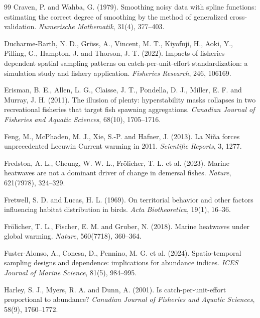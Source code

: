 \begin{thebibliography}{99}
Craven, P. and Wahba, G. (1979). Smoothing noisy data with spline functions: estimating the correct degree of smoothing by the method of generalized cross-validation. \textit{Numerische Mathematik}, 31(4), 377--403.

Ducharme-Barth, N. D., Gr\"uss, A., Vincent, M. T., Kiyofuji, H., Aoki, Y., Pilling, G., Hampton, J. and Thorson, J. T. (2022). Impacts of fisheries-dependent spatial sampling patterns on catch-per-unit-effort standardization: a simulation study and fishery application. \textit{Fisheries Research}, 246, 106169.

Erisman, B. E., Allen, L. G., Claisse, J. T., Pondella, D. J., Miller, E. F. and Murray, J. H. (2011). The illusion of plenty: hyperstability masks collapses in two recreational fisheries that target fish spawning aggregations. \textit{Canadian Journal of Fisheries and Aquatic Sciences}, 68(10), 1705--1716.

Feng, M., McPhaden, M. J., Xie, S.-P. and Hafner, J. (2013). La Ni\~{n}a forces unprecedented Leeuwin Current warming in 2011. \textit{Scientific Reports}, 3, 1277.

Fredston, A. L., Cheung, W. W. L., Fr\"olicher, T. L. et al. (2023). Marine heatwaves are not a dominant driver of change in demersal fishes. \textit{Nature}, 621(7978), 324--329.

Fretwell, S. D. and Lucas, H. L. (1969). On territorial behavior and other factors influencing habitat distribution in birds. \textit{Acta Biotheoretica}, 19(1), 16--36.

Fr\"olicher, T. L., Fischer, E. M. and Gruber, N. (2018). Marine heatwaves under global warming. \textit{Nature}, 560(7718), 360--364.

Fuster-Alonso, A., Conesa, D., Pennino, M. G. et al. (2024). Spatio-temporal sampling designs and dependence: implications for abundance indices. \textit{ICES Journal of Marine Science}, 81(5), 984--995.

Harley, S. J., Myers, R. A. and Dunn, A. (2001). Is catch-per-unit-effort proportional to abundance? \textit{Canadian Journal of Fisheries and Aquatic Sciences}, 58(9), 1760--1772.


\end{thebibliography}
